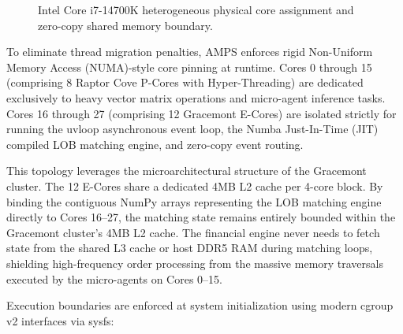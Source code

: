 \begin{figure}[htbp]
\caption{Intel Core i7-14700K heterogeneous physical core assignment and zero-copy shared memory boundary.}
\label{fig:hw_topography}
\end{figure}

To eliminate thread migration penalties, AMPS enforces rigid Non-Uniform Memory Access (NUMA)-style core pinning at runtime. Cores 0 through 15 (comprising 8 Raptor Cove P-Cores with Hyper-Threading) are dedicated exclusively to heavy vector matrix operations and micro-agent inference tasks. Cores 16 through 27 (comprising 12 Gracemont E-Cores) are isolated strictly for running the uvloop asynchronous event loop, the Numba Just-In-Time (JIT) compiled LOB matching engine, and zero-copy event routing.

This topology leverages the microarchitectural structure of the Gracemont cluster. The 12 E-Cores share a dedicated 4MB L2 cache per 4-core block. By binding the contiguous NumPy arrays representing the LOB matching engine directly to Cores 16--27, the matching state remains entirely bounded within the Gracemont cluster's 4MB L2 cache. The financial engine never needs to fetch state from the shared L3 cache or host DDR5 RAM during matching loops, shielding high-frequency order processing from the massive memory traversals executed by the micro-agents on Cores 0--15.

Execution boundaries are enforced at system initialization using modern cgroup v2 interfaces via sysfs:

